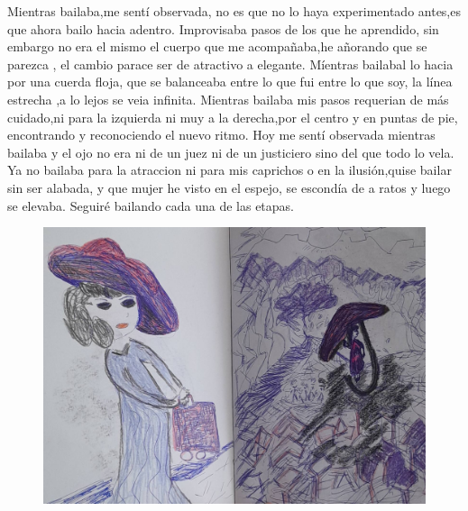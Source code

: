 \documentclass[12pt, a4paper, twoside]{book} %
\begin{document}
Mientras bailaba,me sentí observada, no es que no lo haya experimentado antes,es que ahora bailo hacia adentro.
Improvisaba pasos de los que he aprendido, sin embargo no era el mismo el cuerpo que me acompañaba,he añorando que se parezca , el cambio parace ser de atractivo a elegante.
Míentras bailabal lo hacia por una cuerda floja, que se balanceaba entre lo que fui entre lo que soy, la línea estrecha ,a lo lejos se veia  infinita.
Mientras bailaba mis pasos requerian de más cuidado,ni para la izquierda ni muy a la derecha,por el centro y en puntas de pie, encontrando y reconociendo el nuevo ritmo.
Hoy me sentí observada mientras bailaba y el ojo no era ni de un juez ni de un justiciero sino del que todo lo vela.
Ya no bailaba para la atraccion ni para mis caprichos o en la ilusión,quise bailar sin ser alabada, y que mujer he visto en el espejo, se escondía de a ratos y luego se elevaba.
Seguiré bailando cada una de las etapas.

\begin{figure}[H]
	\centering
	\includegraphics[width=\textwidth]{./images/1f81324df23788.jpg}
\end{figure}
\end{document}
